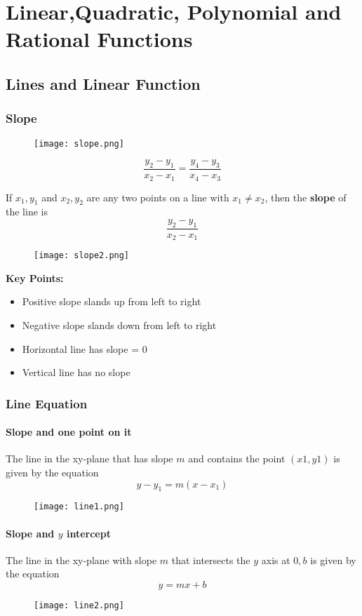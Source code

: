 \chapter{Linear,Quadratic, Polynomial and Rational Functions}
\author{Nithin}

\section{Lines and Linear Function}
\subsection{Slope}
\begin{figure}
  \centering
  \texttt{[image: slope.png]}
\end{figure}
\[\frac{y_{2} - y_{1}}{x_{2} - x_{1}} = \frac{y_{4} - y_{3}}{x_{4} - x_{3}}\]

If \(x_{1},y_{1}\) and \(x_{2},y_{2}\) are any two points on a line with \(x_{1} \neq x_{2}\), then the \textbf{slope} of the line is
\[\frac{y_{2} - y_{1}}{x_{2} - x_{1}}\]

\begin{figure}
  \centering
  \texttt{[image: slope2.png]}
\end{figure}
\textbf{Key Points:}
\begin{itemize}
    \item Positive slope slands up from left to right
    \item Negative slope slands down from left to right
    \item Horizontal line has slope = 0
    \item Vertical line has no slope
\end{itemize}

\subsection{Line Equation}
\subsubsection{Slope and one point on it}
The line in the xy-plane that has slope \(m\) and contains the point \((x1, y1)\) is given by the equation
\[y - y_{1} = m(x  -  x_{1})\]
\begin{figure}
  \centering
  \texttt{[image: line1.png]}
\end{figure}

\subsubsection{Slope and \(y\) intercept}
The line in the xy-plane with slope \(m\) that intersects the \(y\) axis at \(0,b\) is given by the equation
\[y = mx+b\]
\begin{figure}
  \centering
  \texttt{[image: line2.png]}
\end{figure}

